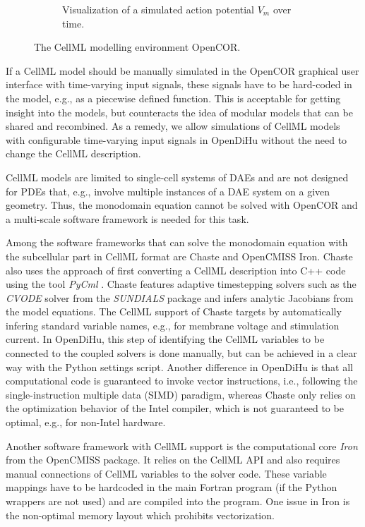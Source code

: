 \begin{figure}
\begin{subfigure}[t]{0.45\textwidth}
    \caption{Visualization of a simulated action potential $V_m$ over time.}%
    \label{fig:opencor2}%
  \end{subfigure}
  \caption{The CellML modelling environment OpenCOR.}%
  \label{fig:opencor}%
\end{figure}%

If a CellML model should be manually simulated in the OpenCOR graphical user interface with time-varying input signals, these signals have to be hard-coded in the model, e.g., as a piecewise defined function. This is acceptable for getting insight into the models, but counteracts the idea of modular models that can be shared and recombined. 
As a remedy, we allow simulations of CellML models with configurable time-varying input signals in OpenDiHu without the need to change the CellML description.

CellML models are limited to single-cell systems of DAEs and are not designed for PDEs that, e.g., involve multiple instances of a DAE system on a given geometry. Thus, the monodomain equation cannot be solved with OpenCOR and a multi-scale software framework is needed for this task.

Among the software frameworks that can solve the monodomain equation with the subcellular part in CellML format are Chaste and OpenCMISS Iron.
Chaste \cite{ChasteCellML2015} also uses the approach of first converting a CellML description into C++ code using the tool \emph{PyCml} \cite{Cooper2006}. Chaste features adaptive timestepping solvers such as the \emph{CVODE} solver from the \emph{SUNDIALS} package \cite{cohen1996cvode} and infers analytic Jacobians from the model equations. The CellML support of Chaste targets  by automatically infering standard variable names, e.g., for membrane voltage and stimulation current.
In OpenDiHu, this step of identifying the CellML variables to be connected to the coupled solvers is done manually, but can be achieved in a clear way with the Python settings script. Another difference in OpenDiHu is that all computational code is guaranteed to invoke vector instructions, i.e., following the single-instruction multiple data (SIMD) paradigm, whereas Chaste only relies on the optimization behavior of the Intel compiler, which is not guaranteed to be optimal, e.g., for non-Intel hardware.

Another software framework with CellML support is the computational core \emph{Iron} from the OpenCMISS package. It relies on the CellML API and also requires manual connections of CellML variables to the solver code. These variable mappings have to be hardcoded in the main Fortran program (if the Python wrappers are not used) and are compiled into the program. One issue in Iron is the non-optimal memory layout which prohibits vectorization. 

